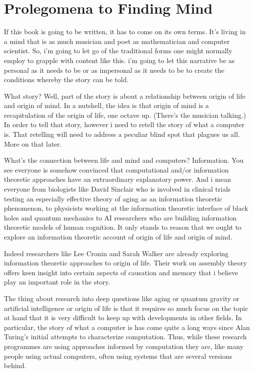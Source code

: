 \chapter{Prolegomena to Finding Mind}
\label{chap:prolegomena}

If this book is going to be written, it has to come on its own terms. It's living in a mind that is as much musician and poet as mathematician and computer scientist. So, i'm going to let go of the traditional forms one might normally employ to grapple with content like this. i'm going to let this narrative be as personal as it needs to be or as impersonal as it needs to be to create the conditions whereby the story can be told.

What story? Well, part of the story is about a relationship between origin of life and origin of mind. In a nutshell, the idea is that origin of mind is a recapitulation of the origin of life, one octave up. (There's the musician talking.) In order to tell that story, however i need to retell the story of what a computer is. That retelling will need to address a peculiar blind spot that plagues us all. More on that later.

What's the connection between life and mind and computers? Information. You see everyone is somehow convinced that computational and/or information theoretic approaches have an extraordinary explanatory power. And i mean everyone from biologists like David Sinclair who is involved in clinical trials testing an especially effective theory of aging as an information theoretic phenomenon, to physicists working at the information theoretic interface of black holes and quantum mechanics to AI researchers who are building information theoretic models of human cognition. It only stands to reason that we ought to explore an information theoretic account of origin of life and origin of mind.

Indeed researchers like Lee Cronin and Sarah Walker are already exploring information theoretic approaches to origin of life. Their work on assembly theory offers keen insight into certain aspects of causation and memory that i believe play an important role in the story.

The thing about research into deep questions like aging or quantum gravity or artificial intelligence or origin of life is that it requires so much focus on the topic at hand that it is very difficult to keep up with developments in other fields. In particular, the story of what a computer is has come quite a long ways since Alan Turing's initial attempts to characterize computation. Thus, while these research programmes are using approaches informed by computation they are, like many people using actual computers, often using systems that are several versions behind.

